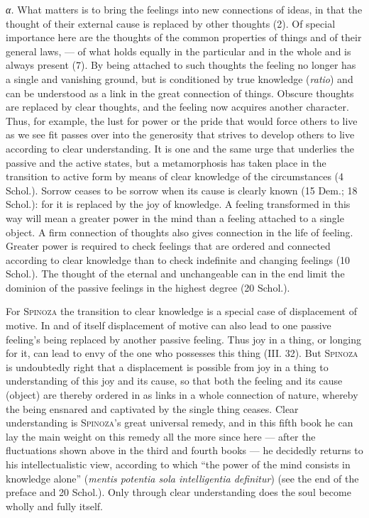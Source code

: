 \documentclass[12pt]{article}
\newcommand{\opage}[1]{\marginnote{\footnotesize\textit{[#1]}}}
\begin{document}
\textit{α.} What matters is to bring the feelings into new connections of ideas, in that the
thought of their external cause is replaced by other thoughts (2). Of special importance here are
the thoughts of the common properties of things and of their general laws, --- of what holds
equally in the particular and in the whole and is always present (7). By being attached to such
thoughts the feeling no longer has a single and vanishing ground, but is conditioned by true
knowledge (\textit{ratio}) and can be understood as a link in the great connection of things.
Obscure thoughts are replaced by clear thoughts, and the feeling now acquires another character.
Thus, for example, the lust for power or the pride that would force others to live as we see fit
passes over into the generosity that strives to develop others to live according to clear
understanding. It is one and the same urge that underlies the passive and the active states, but a
metamorphosis has taken place in the transition to active form by means of clear knowledge
\opage{88}of the circumstances (4 Schol.). Sorrow ceases to be sorrow when its cause is clearly
known (15 Dem.; 18 Schol.): for it is replaced by the joy of knowledge. A feeling transformed in
this way will mean a greater power in the mind than a feeling attached to a single object. A firm
connection of thoughts also gives connection in the life of feeling. Greater power is required to
check feelings that are ordered and connected according to clear knowledge than to check
indefinite and changing feelings (10 Schol.). The thought of the eternal and unchangeable can in
the end limit the dominion of the passive feelings in the highest degree (20 Schol.).

For \textsc{Spinoza} the transition to clear knowledge is a special case of displacement of motive.
In and of itself displacement of motive can also lead to one passive feeling's being replaced by
another passive feeling. Thus joy in a thing, or longing for it, can lead to envy of the one who
possesses this thing (III. 32). But \textsc{Spinoza} is undoubtedly right that a displacement is
possible from joy in a thing to understanding of this joy and its cause, so that both the feeling
and its cause (object) are thereby ordered in as links in a whole connection of nature, whereby the
being ensnared and captivated by the single thing ceases. Clear understanding is \textsc{Spinoza}'s
great universal remedy, and in this fifth book he can lay the main weight on this remedy all the
more since here --- after the fluctuations shown above in the third and fourth books --- he
decidedly returns to his intellectualistic view, according to which ``the power of the mind
consists in knowledge alone'' (\textit{mentis potentia sola intelligentia definitur}) (see the end
of the preface and 20 Schol.). Only through clear understanding does the soul become wholly and
fully itself.
\end{document}

